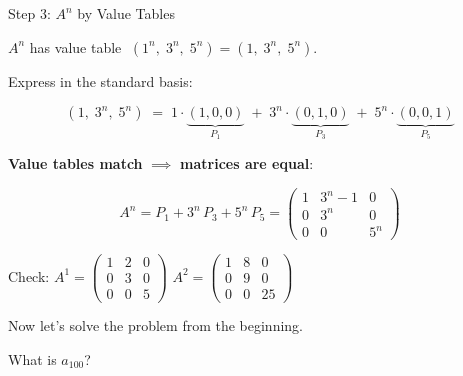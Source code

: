 \documentclass[10pt]{beamer}
\theoremstyle{definition}
\newcommand{\x}[1]{\alert{\textbf{#1}}}
\begin{document}
%
%
\begin{frame}[shrink=2]{Step 3: $A^n$ by Value Tables}

$A^n$ has value table $\;(1^n,\; 3^n,\; 5^n) = (1,\; 3^n,\; 5^n)$.

\vfill

Express in the standard basis:

$$(1,\; 3^n,\; 5^n) \;=\; 1 \cdot \underbrace{(1,0,0)}_{P_1} \;+\; 3^n \cdot \underbrace{(0,1,0)}_{P_3} \;+\; 5^n \cdot \underbrace{(0,0,1)}_{P_5}$$

\vfill

\x{Value tables match} $\implies$ \x{matrices are equal}:

$$\boxed{A^n = P_1 + 3^n\, P_3 + 5^n\, P_5 = \begin{pmatrix} 1 & 3^n - 1 & 0 \\ 0 & 3^n & 0 \\ 0 & 0 & 5^n \end{pmatrix}}$$

\vfill\pause

Check: $A^1 = \begin{pmatrix}1&2&0\\0&3&0\\0&0&5\end{pmatrix}$ \;\checkmark \qquad
$A^2 = \begin{pmatrix}1&8&0\\0&9&0\\0&0&25\end{pmatrix}$ \;\checkmark

\end{frame}


\begin{frame}{}

\vfill

\begin{center}
{\Large Now let's solve the problem from the beginning.}

\vspace{1cm}

{\Large What is $a_{100}$?}
\end{center}

\vfill

\end{frame}
\end{document}
